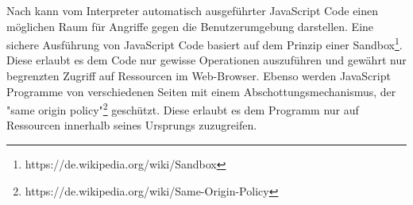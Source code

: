 Nach \textcite[1]{kirda2009} kann vom Interpreter automatisch ausgeführter JavaScript Code einen möglichen Raum für Angriffe gegen die Benutzerumgebung darstellen. Eine sichere Ausführung von JavaScript Code basiert auf dem Prinzip einer Sandbox\footnote[2]{https://de.wikipedia.org/wiki/Sandbox}. Diese erlaubt es dem Code nur gewisse Operationen auszuführen und gewährt nur begrenzten Zugriff auf Ressourcen im Web-Browser. Ebenso werden JavaScript Programme von verschiedenen Seiten mit einem Abschottungsmechanismus, der "same origin policy"\footnote[2]{https://de.wikipedia.org/wiki/Same-Origin-Policy} geschützt. Diese erlaubt es dem Programm nur auf Ressourcen innerhalb seines Ursprungs zuzugreifen.